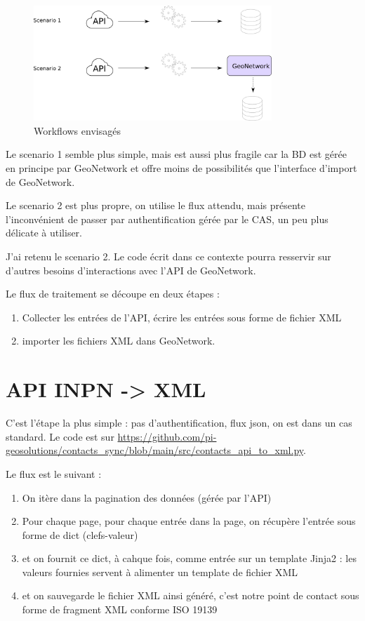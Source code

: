 \documentclass[11pt, a4paper, oneside]{book}
\newcommand{\gn}{GeoNetwork\xspace}
\begin{document}
\begin{figure}[hbtp]
	\centering
	\includegraphics[width=0.8\textwidth]{includes/scenarii.png}
	\caption{Workflows envisagés}
\end{figure}

Le scenario 1 semble plus simple, mais est aussi plus fragile car la BD est gérée en principe par \gn et offre moins de possibilités que l'interface d'import de \gn.

Le scenario 2 est plus propre, on utilise le flux attendu, mais présente l'inconvénient de passer par authentification gérée par le CAS, un peu plus délicate à utiliser.

J'ai retenu le scenario 2. Le code écrit dans ce contexte pourra resservir sur d'autres besoins d'interactions avec l'API de \gn. 

Le flux de traitement se découpe en deux étapes :
\begin{enumerate}
	\item Collecter les entrées de l'API, écrire les entrées sous forme de fichier XML
	\item importer les fichiers XML dans \gn.
\end{enumerate}


\section*{API INPN -> XML}
C'est l'étape la plus simple : pas d'authentification, flux json, on est dans un cas standard.
Le code est sur \url{https://github.com/pi-geosolutions/contacts_sync/blob/main/src/contacts_api_to_xml.py}.

Le flux est le suivant : 

\begin{enumerate}
	\item On itère dans la pagination des données (gérée par l'API)
	\item Pour chaque page, pour chaque entrée dans la page, on récupère l'entrée sous forme de dict (clefs-valeur)
	\item et on fournit ce dict, à cahque fois, comme entrée sur un template Jinja2 : les valeurs fournies servent à alimenter un template de fichier XML
	\item et on sauvegarde le fichier XML ainsi généré, c'est notre point de contact sous forme de fragment XML conforme ISO 19139
\end{enumerate}
\end{document}
